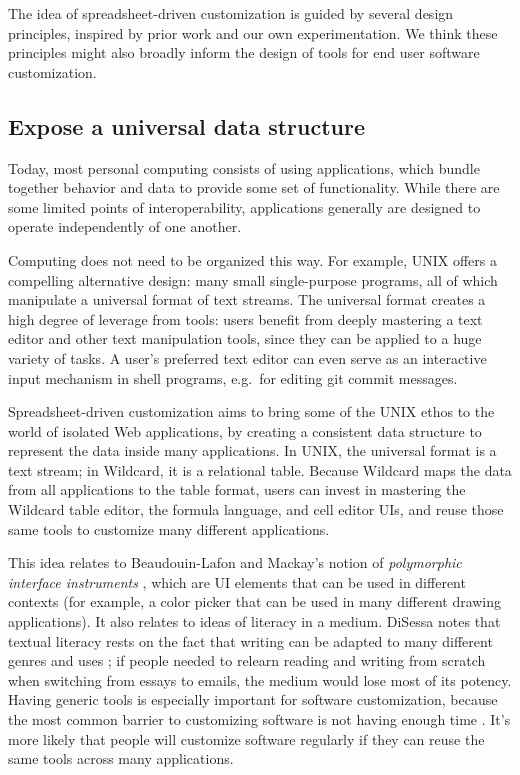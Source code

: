 \documentclass[english,submission]{programming}
\begin{document}
The idea of spreadsheet-driven customization is guided by several design
principles, inspired by prior work and our own experimentation. We think
these principles might also broadly inform the design of tools for end
user software customization.

\hypertarget{expose-a-universal-data-structure}{%
\subsection{Expose a universal data
structure}\label{expose-a-universal-data-structure}}

Today, most personal computing consists of using applications, which
bundle together behavior and data to provide some set of functionality.
While there are some limited points of interoperability, applications
generally are designed to operate independently of one another.

Computing does not need to be organized this way. For example, UNIX
offers a compelling alternative design: many small single-purpose
programs, all of which manipulate a universal format of text streams.
The universal format creates a high degree of leverage from tools: users
benefit from deeply mastering a text editor and other text manipulation
tools, since they can be applied to a huge variety of tasks. A user's
preferred text editor can even serve as an interactive input mechanism
in shell programs, e.g.~for editing git commit messages.

Spreadsheet-driven customization aims to bring some of the UNIX ethos to
the world of isolated Web applications, by creating a consistent data
structure to represent the data inside many applications. In UNIX, the
universal format is a text stream; in Wildcard, it is a relational
table. Because Wildcard maps the data from all applications to the table
format, users can invest in mastering the Wildcard table editor, the
formula language, and cell editor UIs, and reuse those same tools to
customize many different applications.

This idea relates to Beaudouin-Lafon and Mackay's notion of
\emph{polymorphic interface instruments} \autocite{beaudouin-lafon2000},
which are UI elements that can be used in different contexts (for
example, a color picker that can be used in many different drawing
applications). It also relates to ideas of literacy in a medium. DiSessa
notes that textual literacy rests on the fact that writing can be
adapted to many different genres and uses \autocite{disessa2000}; if
people needed to relearn reading and writing from scratch when switching
from essays to emails, the medium would lose most of its potency. Having
generic tools is especially important for software customization,
because the most common barrier to customizing software is not having
enough time \autocite{mackay1991}. It's more likely that people will
customize software regularly if they can reuse the same tools across
many applications.
\end{document}
